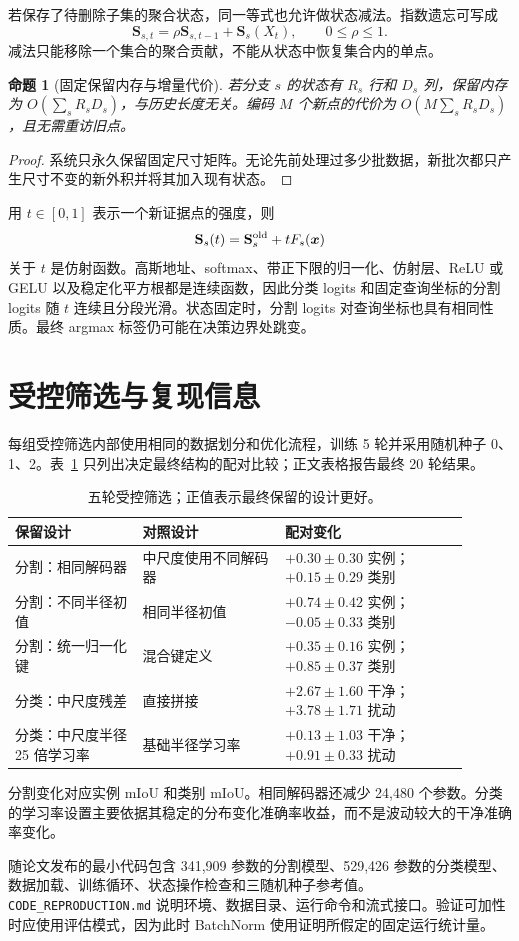 \documentclass[UTF8,a4paper,11pt,fontset=windows]{ctexart}
\newtheorem{proposition}{命题}
\newcommand{\Sstate}{\mathbf{S}}
\begin{document}
若保存了待删除子集的聚合状态，同一等式也允许做状态减法。指数遗忘可写成
\[
\Sstate_{s,t}=\rho\Sstate_{s,t-1}+\Sstate_s(X_t),\qquad 0\leq\rho\leq1.
\]
减法只能移除一个集合的聚合贡献，不能从状态中恢复集合内的单点。

\begin{proposition}[固定保留内存与增量代价]
若分支 $s$ 的状态有 $R_s$ 行和 $D_s$ 列，保留内存为 $O(\sum_sR_sD_s)$，与历史长度无关。编码 $M$ 个新点的代价为 $O(M\sum_sR_sD_s)$，且无需重访旧点。
\end{proposition}
\begin{proof}
系统只永久保留固定尺寸矩阵。无论先前处理过多少批数据，新批次都只产生尺寸不变的新外积并将其加入现有状态。
\end{proof}

用 $t\in[0,1]$ 表示一个新证据点的强度，则
\[
\Sstate_s(t)=\Sstate_s^{\rm old}+tF_s(\bm x)
\]
关于 $t$ 是仿射函数。高斯地址、softmax、带正下限的归一化、仿射层、ReLU 或 GELU 以及稳定化平方根都是连续函数，因此分类 logits 和固定查询坐标的分割 logits 随 $t$ 连续且分段光滑。状态固定时，分割 logits 对查询坐标也具有相同性质。最终 argmax 标签仍可能在决策边界处跳变。

\section{受控筛选与复现信息}

每组受控筛选内部使用相同的数据划分和优化流程，训练 5 轮并采用随机种子 0、1、2。表~\ref{tab:screens-cn} 只列出决定最终结构的配对比较；正文表格报告最终 20 轮结果。

\begin{table}[htbp]
\centering
\small
\caption{五轮受控筛选；正值表示最终保留的设计更好。}
\label{tab:screens-cn}
\begin{tabular}{p{0.25\linewidth}p{0.29\linewidth}p{0.36\linewidth}}
\toprule
保留设计 & 对照设计 & 配对变化\\
\midrule
分割：相同解码器 & 中尺度使用不同解码器 & $+0.30\pm0.30$ 实例；$+0.15\pm0.29$ 类别\\
分割：不同半径初值 & 相同半径初值 & $+0.74\pm0.42$ 实例；$-0.05\pm0.33$ 类别\\
分割：统一归一化键 & 混合键定义 & $+0.35\pm0.16$ 实例；$+0.85\pm0.37$ 类别\\
分类：中尺度残差 & 直接拼接 & $+2.67\pm1.60$ 干净；$+3.78\pm1.71$ 扰动\\
分类：中尺度半径 25 倍学习率 & 基础半径学习率 & $+0.13\pm1.03$ 干净；$+0.91\pm0.33$ 扰动\\
\bottomrule
\end{tabular}
\end{table}

分割变化对应实例 mIoU 和类别 mIoU。相同解码器还减少 24,480 个参数。分类的学习率设置主要依据其稳定的分布变化准确率收益，而不是波动较大的干净准确率变化。

随论文发布的最小代码包含 341,909 参数的分割模型、529,426 参数的分类模型、数据加载、训练循环、状态操作检查和三随机种子参考值。\texttt{CODE\_REPRODUCTION.md} 说明环境、数据目录、运行命令和流式接口。验证可加性时应使用评估模式，因为此时 BatchNorm 使用证明所假定的固定运行统计量。
\end{document}
